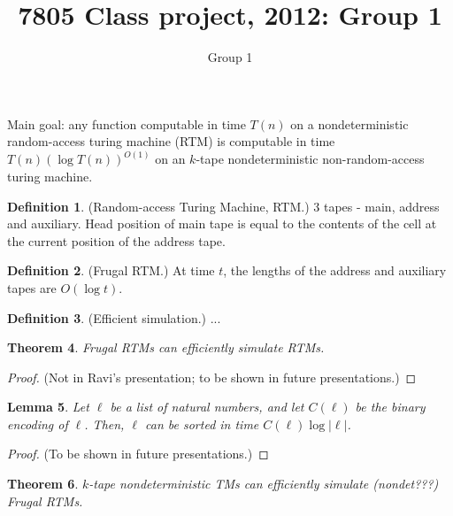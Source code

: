 \documentclass[english]{article}
\theoremstyle{plain}
\newtheorem{thm}{Theorem}
\theoremstyle{definition}
\newtheorem{defn}[thm]{Definition}
\theoremstyle{plain}
\newtheorem{lem}[thm]{Lemma}
\begin{document}
\title{7805 Class project, 2012: Group 1}
\author{Group 1}
\maketitle

Main goal: any function computable in time $T(n)$ on a nondeterministic
random-access turing machine (RTM) is computable in time $T(n)(\log T(n))^{O(1)}$
on an $k$-tape nondeterministic non-random-access turing machine.

\begin{defn}
(Random-access Turing Machine, RTM.) 3 tapes - main, address and auxiliary.
Head position of main tape is equal to the contents of the cell at
the current position of the address tape.
\end{defn}

\begin{defn}
(Frugal RTM.) At time $t$, the lengths of the address and auxiliary
tapes are $O(\log t)$.
\end{defn}

\begin{defn}
(Efficient simulation.) ...
\end{defn}

\begin{thm}
Frugal RTMs can efficiently simulate RTMs.
\end{thm}

\begin{proof}
(Not in Ravi's presentation; to be shown in future presentations.)
\end{proof}

\begin{lem}
Let $\ell$ be a list of natural numbers, and let $C(\ell)$ be the
binary encoding of $\ell$. Then, $\ell$ can be sorted in time $C(\ell)\log|\ell|$.
\end{lem}

\begin{proof}
(To be shown in future presentations.)
\end{proof}

\begin{thm}
$k$-tape nondeterministic TMs can efficiently simulate (nondet???)
Frugal RTMs.
\end{thm}
\end{document}
